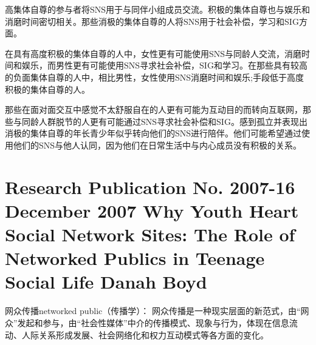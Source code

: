 高集体自尊的参与者将SNS用于与同伴小组成员交流。积极的集体自尊也与娱乐和消磨时间密切相关。那些消极的集体自尊的人将SNS用于社会补偿，学习和SIG方面。
 
在具有高度积极的集体自尊的人中，女性更有可能使用SNS与同龄人交流，消磨时间和娱乐，而男性更有可能使用SNS寻求社会补偿，SIG和学习。在那些具有较高的负面集体自尊的人中，相比男性，女性使用SNS消磨时间和娱乐;手段低于高度积极的集体自尊的人。

那些在面对面交互中感觉不太舒服自在的人更有可能为互动目的而转向互联网，那些与同龄人群脱节的人更有可能通过SNS寻求社会补偿和SIG。感到孤立并表现出消极的集体自尊的年长青少年似乎转向他们的SNS进行陪伴。他们可能希望通过使用他们的SNS与他人认同，因为他们在日常生活中与内心成员没有积极的关系。

\section*{Research Publication No. 2007-16 December 2007 
      Why Youth Heart Social Network Sites:  The Role of Networked Publics in Teenage Social Life 
Danah Boyd}

网众传播networked public（传播学）： 网众传播是一种现实层面的新范式，由“网众”发起和参与，由“社会性媒体”中介的传播模式、现象与行为，体现在信息流动、人际关系形成发展、社会网络化和权力互动模式等各方面的变化。

